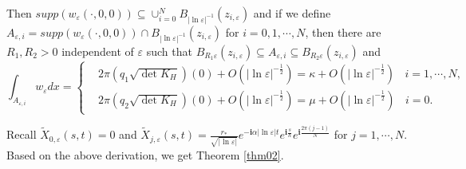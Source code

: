\documentclass[12pt,reqno]{amsart}
\numberwithin{equation}{section}
\theoremstyle{definition}
\theoremstyle{remark}
\begin{document}
Then $ supp(w_\varepsilon(\cdot,0,0))\subseteq \cup_{i=0}^N B_{|\ln\varepsilon|^{-1}}\left (z_{i,\varepsilon}\right ) $
and if we define $ A_{\varepsilon,i}=supp(w_\varepsilon(\cdot,0,0))\cap B_{|\ln\varepsilon|^{-1}}\left (z_{i,\varepsilon}\right )  $ for $ i=0,1,\cdots,N $, then there are $ R_1,R_2>0 $ independent of $ \varepsilon $  such that $ B_{R_1\varepsilon}\left ( z_{i,\varepsilon}\right )\subseteq A_{\varepsilon,i}\subseteq B_{R_2\varepsilon}\left (z_{i,\varepsilon}\right ) $ and  
\begin{equation*}
\int_{A_{\varepsilon,i}}w_\varepsilon dx=\begin{cases}
&2\pi \left( q_1\sqrt{\det K_H }\right) (0)+O\left(|\ln\varepsilon|^{-\frac{1}{2}} \right)=\kappa+O\left(|\ln\varepsilon|^{-\frac{1}{2}} \right)\ \ \ \ i=1,\cdots,N,\\
 &2\pi \left( q_2\sqrt{\det K_H }\right) (0)+O\left(|\ln\varepsilon|^{-\frac{1}{2}} \right)=\mu+O\left(|\ln\varepsilon|^{-\frac{1}{2}} \right)\ \ \ \ i=0.
\end{cases}
\end{equation*}

Recall $ 	 
\tilde{X}_{0,\varepsilon}(s,t)=0$ and $ \tilde{X}_{j,\varepsilon}(s,t)=\frac{r_*}{\sqrt{|\ln\varepsilon|}}e^{-\mathbf{i}\alpha|\ln\varepsilon|t}e^{\mathbf{i}\frac{s}{h}}e^{\mathbf{i}\frac{2\pi (j-1)}{N}} 
  $ for $ j=1,\cdots,N $. Based on the above derivation, we get Theorem \ref{thm02}.
\end{document}
